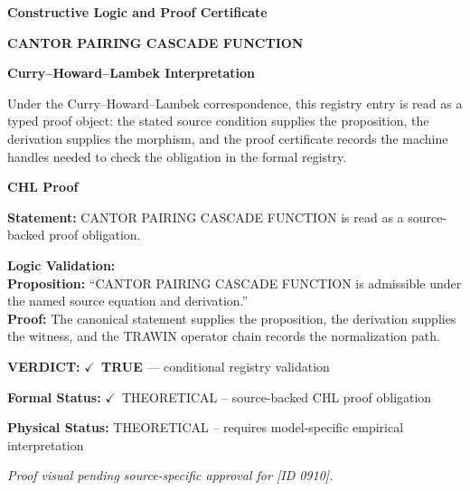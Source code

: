 \clearpage
\begingroup\tzpsupportsetup
\noindent\textbf{\fontsize{10.8pt}{12.8pt}\selectfont [ID 0910] Constructive Logic and Proof Certificate}\par
\noindent\textbf{\fontsize{10pt}{12pt}\selectfont CANTOR PAIRING CASCADE FUNCTION}\par
\vspace{0.45em}
\begingroup
\footnotesize
\setlength{\parskip}{0.22em}
\setlength{\parindent}{0pt}
\noindent\textbf{Curry--Howard--Lambek Interpretation}\par
Under the Curry--Howard--Lambek correspondence, this registry entry is read as a typed proof
object: the stated source condition supplies the proposition, the derivation supplies the
morphism, and the proof certificate records the machine handles needed to check the obligation
in the formal registry.

\vspace{0.45em}
\noindent\textbf{CHL Proof}\par
\textbf{Statement:} CANTOR PAIRING CASCADE FUNCTION is read as a source-backed proof obligation.

\textbf{Logic Validation:}\\
\textbf{Proposition:} ``CANTOR PAIRING CASCADE FUNCTION is admissible under the named source equation and derivation.''\\
\textbf{Proof:} The canonical statement supplies the proposition, the derivation supplies the witness, and the TRAWIN operator chain records the normalization path.

\textbf{VERDICT:} \ensuremath{\checkmark}\ \textbf{TRUE} --- conditional registry validation

\textbf{Formal Status:} \ensuremath{\checkmark}\ THEORETICAL -- source-backed CHL proof obligation

\textbf{Physical Status:} THEORETICAL -- requires model-specific empirical interpretation
\par\vspace{0.45em}
\par
\vfill
\begingroup\footnotesize\itshape
Proof visual pending source-specific approval for [ID 0910].
\par\endgroup
\vfill
\endgroup
\endgroup
